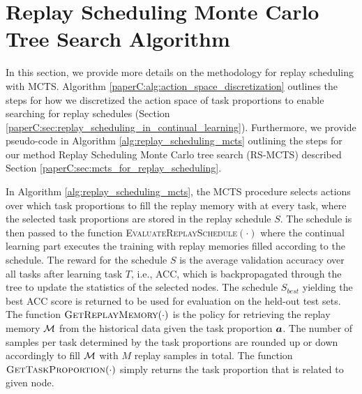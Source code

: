 

\section[Replay Scheduling MCTS Algorithm]{Replay Scheduling Monte Carlo Tree Search Algorithm}\label{paperC:app:rs_mcts_algorithm}



In this section, we provide more details on the methodology for replay scheduling with MCTS. Algorithm \ref{paperC:alg:action_space_discretization} outlines the steps for how we discretized the action space of task proportions to enable searching for replay schedules (Section \ref{paperC:sec:replay_scheduling_in_continual_learning}). Furthermore, we provide pseudo-code in Algorithm \ref{alg:replay_scheduling_mcts} outlining the steps for our method Replay Scheduling Monte Carlo tree search (RS-MCTS) described Section \ref{paperC:sec:mcts_for_replay_scheduling}. %

In Algorithm \ref{alg:replay_scheduling_mcts}, the MCTS procedure selects actions over which task proportions to fill the replay memory with at every task, where the selected task proportions are stored in the replay schedule $S$. The schedule is then passed to 
the function \textsc{EvaluateReplaySchedule$(\cdot)$} 
where the continual learning part executes the training with replay memories filled according to the schedule. The reward for the schedule $S$ is the average validation accuracy over all tasks after learning task $T$, i.e., ACC, which is backpropagated through the tree to update the statistics of the selected nodes. The schedule $S_{best}$ yielding the best ACC score is returned to be used for evaluation on the held-out test sets. The function $\textsc{GetReplayMemory}(\cdot)$ is the policy for retrieving the replay memory ${\mathcal{M}}$ from the historical data given the task proportion ${\bm{a}}$. The number of samples per task determined by the task proportions are rounded up or down accordingly to fill ${\mathcal{M}}$ with $M$ replay samples in total. 
The function $\textsc{GetTaskProportion}(\cdot)$ simply returns the task proportion that is related to given node.



